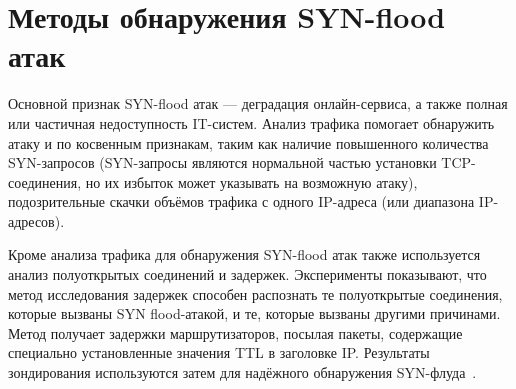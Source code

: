 \documentclass{bmstu}
\begin{document}


\section*{Методы обнаружения SYN-flood атак}

Основной признак SYN-flood атак --- деградация онлайн-сервиса, а также полная или частичная недоступность IT-систем. Анализ трафика помогает обнаружить атаку и по косвенным признакам, таким как наличие повышенного количества SYN-запросов (SYN-запросы являются нормальной частью установки TCP-соединения, но их избыток может указывать на возможную атаку), подозрительные скачки объёмов трафика с одного IP-адреса (или диапазона IP-адресов). 

Кроме анализа трафика для обнаружения SYN-flood атак также используется анализ полуоткрытых соединений и задержек. Эксперименты показывают, что метод исследования задержек способен распознать те полуоткрытые соединения, которые вызваны SYN flood-атакой, и те, которые вызваны другими причинами. Метод получает задержки маршрутизаторов, посылая пакеты, содержащие специально установленные значения TTL в заголовке IP. Результаты зондирования используются затем для надёжного обнаружения SYN-флуда~\cite{корнев2012активные}.


\end{document}
